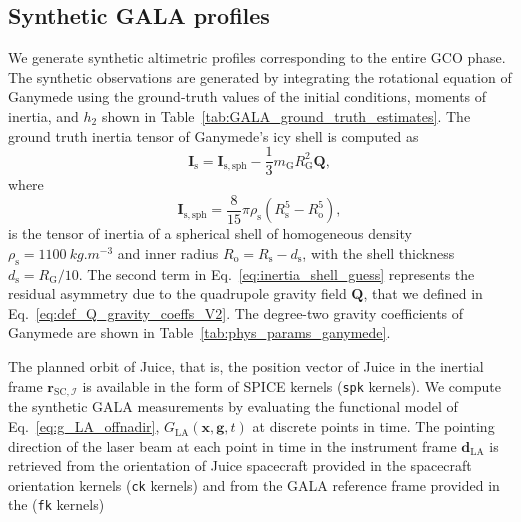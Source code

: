 \documentclass[lineno, pdflatex,sn-mathphys-ay]{sn-jnl}
\theoremstyle{thmstyleone}%
\theoremstyle{thmstyletwo}%
\theoremstyle{thmstylethree}%
\renewcommand{\vec}[1]{\boldsymbol{#1}}
\begin{document}
\subsection{Synthetic GALA profiles}\label{sec:GALA_data}
%
We generate synthetic altimetric profiles corresponding to the   entire GCO phase.
The synthetic observations are generated by integrating the rotational equation of Ganymede using the ground-truth values of the initial conditions, moments of inertia, and $h_2$ shown in Table~\ref{tab:GALA_ground_truth_estimates}. 
%
The ground truth inertia tensor of Ganymede's icy shell is computed as
%
\begin{equation}
	\label{eq:inertia_shell_guess}
	\vec{I}_{\mathrm{s}} = \vec{I}_{\mathrm{s,sph}} - \frac{1}{3}m_{\mathrm{G}}R_{\mathrm{G}}^2 \vec{Q}, 
\end{equation}
where 
\begin{equation}
	\vec{I}_{\mathrm{s,sph}} = \frac{8}{15}\pi \rho_{\mathrm{s}}\left(R_{\mathrm{s}}^5 - R_{\mathrm{o}}^5\right),
\end{equation}
is the tensor of inertia of a spherical shell of homogeneous density 
${\rho_\mathrm{s} = \SI{1100}{kg.m^{-3}}}$
and inner radius ${R_{\mathrm{o}} = R_{\mathrm{s}}-d_{\mathrm{s}}}$, with the shell thickness
${d_\mathrm{s} = R_\mathrm{G}/10}$.
%
The second term in Eq.~\eqref{eq:inertia_shell_guess} represents the residual asymmetry due to the quadrupole gravity field $\vec{Q}$, that we defined in Eq.~\eqref{eq:def_Q_gravity_coeffs_V2}.
%
The degree-two gravity coefficients of Ganymede are shown in Table~\ref{tab:phys_params_ganymede}.

%  
%

The planned orbit of Juice, that is, the position vector of Juice in the inertial frame $\vec{r}_{\mathrm{SC},\mathcal{I}}$ is available in the form of SPICE kernels (\texttt{spk} kernels).
We compute the synthetic GALA measurements by evaluating the functional model of Eq.~\eqref{eq:g_LA_offnadir}, ${G}_{\mathrm{LA}}(\vec{x},\vec{g},t)$ at discrete points in time. 
%
The pointing direction of the laser beam at each point in time in the instrument frame $\vec{d}_{\mathrm{LA}}$ is retrieved from the orientation of  Juice spacecraft provided in the spacecraft orientation kernels (\texttt{ck} kernels) and from the  GALA reference frame provided in the (\texttt{fk} kernels)
\end{document}
